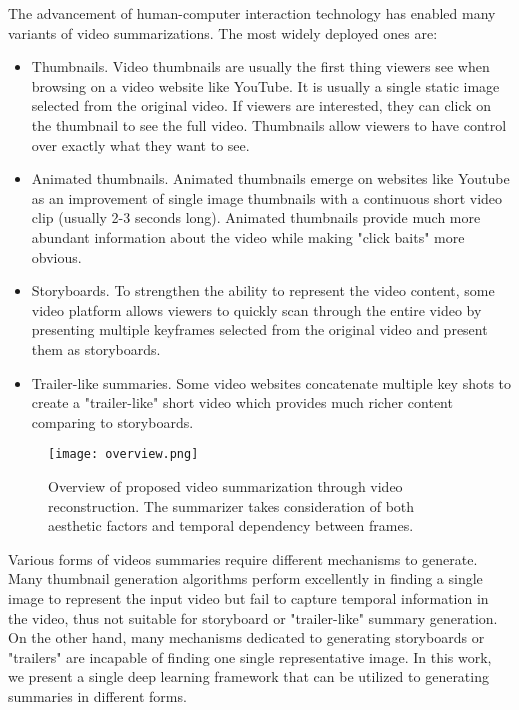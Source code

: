\documentclass[5pt]{article}
\begin{document}
The advancement of human-computer interaction technology has enabled many variants of video summarizations. The most widely deployed ones are:
\begin{itemize}[topsep=0pt,itemsep=-1ex,partopsep=1ex,parsep=1ex]
\item Thumbnails. Video thumbnails are usually the first thing viewers see when browsing on a video website like YouTube. It is usually a single static image selected from the original video. If viewers are interested, they can click on the thumbnail to see the full video. Thumbnails allow viewers to have control over exactly what they want to see. 
\item Animated thumbnails. Animated thumbnails emerge on websites like Youtube as an improvement of single image thumbnails with a continuous short video clip (usually 2-3 seconds long). Animated thumbnails provide much more abundant information about the video while making "click baits" more obvious.
\item Storyboards. To strengthen the ability to represent the video content, some video platform allows viewers to quickly scan through the entire video by presenting multiple keyframes selected from the original video and present them as storyboards.
\item Trailer-like summaries. Some video websites concatenate multiple key shots to create a "trailer-like" short video which provides much richer content comparing to storyboards.
\end{itemize}

\begin{figure}[h!]
    \centering
    \texttt{[image: overview.png]}
    \caption{Overview of proposed video summarization through video reconstruction. The summarizer takes consideration of both aesthetic factors and temporal dependency between frames. }
    \label{fig:overview}
\end{figure}

Various forms of videos summaries require different mechanisms to generate. Many thumbnail generation algorithms perform excellently in finding a single image to represent the input video but fail to capture temporal information in the video, thus not suitable for storyboard or "trailer-like" summary generation. On the other hand, many mechanisms dedicated to generating storyboards or "trailers" are incapable of finding one single representative image. In this work, we present a single deep learning framework that can be utilized to generating summaries in different forms. 
\end{document}
